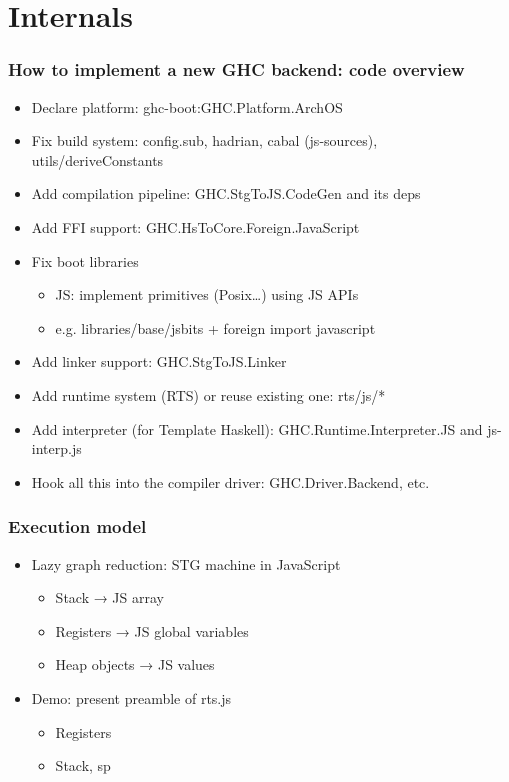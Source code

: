 \documentclass{beamer}
\begin{document}
\section{Internals}


\begin{frame}
  \frametitle{How to implement a new GHC backend: code overview}
  \begin{itemize}
\item Declare platform: ghc-boot:GHC.Platform.ArchOS
\item Fix build system: config.sub, hadrian, cabal (js-sources),
  utils/deriveConstants
\item Add compilation pipeline: GHC.StgToJS.CodeGen and its deps
\item Add FFI support: GHC.HsToCore.Foreign.JavaScript
\item Fix boot libraries
  \begin{itemize}
\item JS: implement primitives (Posix…) using JS APIs
\item e.g. libraries/base/jsbits + foreign import javascript
  \end{itemize}
\item Add linker support: GHC.StgToJS.Linker
\item Add runtime system (RTS) or reuse existing one: rts/js/*
\item Add interpreter (for Template Haskell): GHC.Runtime.Interpreter.JS and
  js-interp.js
\item Hook all this into the compiler driver: GHC.Driver.Backend, etc.
\end{itemize}
\end{frame}


\begin{frame}
\frametitle{Execution model}
  \begin{itemize}
    \item Lazy graph reduction: STG machine in JavaScript
      \begin{itemize}
    \item Stack → JS array
    \item Registers → JS global variables
    \item Heap objects  → JS values
      \end{itemize}
    \item Demo: present preamble of rts.js
      \begin{itemize}
        \item Registers
        \item Stack, sp
      \end{itemize}
    \end{itemize}
\end{frame}
\end{document}
